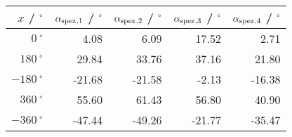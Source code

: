 \begin{tabular}{rrrrr}\\
 $x$ / ${}^\circ$ & $\alpha_\text{spez}{}_{,1}$ / ${}^\circ$ & $\alpha_\text{spez}{}_{,2}$ / ${}^\circ$ & $\alpha_\text{spez}{}_{,3}$ / ${}^\circ$ & $\alpha_\text{spez}{}_{,4}$ / ${}^\circ$  \\
 \hline
$0~^\circ$ & 4.08 & 6.09 & 17.52 & 2.71\\
$180~^\circ$ & 29.84 & 33.76 & 37.16 & {\color{red} 21.80}\\
$-180~^\circ$ & {\color{red} -21.68} & {\color{red} -21.58} & -2.13 & -16.38\\
$360~^\circ$ & 55.60 & 61.43 & 56.80 & 40.90\\
$-360~^\circ$ & -47.44 & -49.26 & {\color{red} -21.77} & -35.47
\end{tabular}